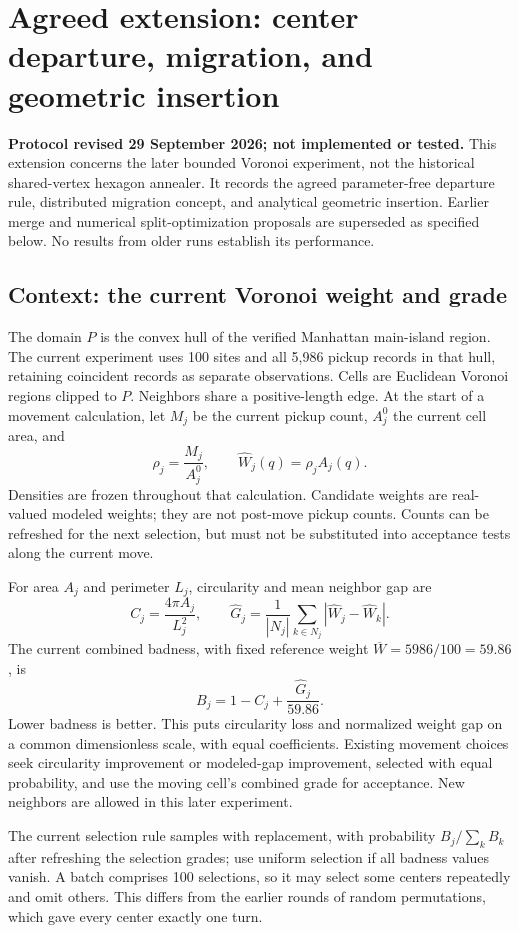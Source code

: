 \documentclass[11pt]{article}
\begin{document}
\clearpage
\section{Agreed extension: center departure, migration, and geometric insertion}
\label{sec:merge-migrate-split}
\textbf{Protocol revised 29 September 2026; not implemented or tested.}
This extension concerns the later bounded Voronoi experiment, not the historical
shared-vertex hexagon annealer. It records the agreed parameter-free departure
rule, distributed migration concept, and analytical geometric insertion.
Earlier merge and numerical split-optimization proposals are superseded as
specified below. No results from older runs establish its performance.

\subsection{Context: the current Voronoi weight and grade}
The domain $P$ is the convex hull of the verified Manhattan main-island region.
The current experiment uses 100 sites and all 5,986 pickup records in that hull,
retaining coincident records as separate observations. Cells are Euclidean
Voronoi regions clipped to $P$. Neighbors share a positive-length edge.
At the start of a movement calculation, let $M_j$ be the current pickup count,
$A_j^0$ the current cell area, and
\[
 \rho_j=\frac{M_j}{A_j^0},\qquad
 \widehat W_j(q)=\rho_j A_j(q).
\]
Densities are frozen throughout that calculation. Candidate weights are real-valued
modeled weights; they are not post-move pickup counts. Counts can be refreshed
for the next selection, but must not be substituted into acceptance tests along
the current move.

For area $A_j$ and perimeter $L_j$, circularity and mean neighbor gap are
\[
 C_j=\frac{4\pi A_j}{L_j^2},\qquad
 \widehat G_j=\frac{1}{|N_j|}\sum_{k\in N_j}
          |\widehat W_j-\widehat W_k|.
\]
The current combined badness, with fixed reference weight
$\overline W=5986/100=59.86$, is
\[
 B_j=1-C_j+\frac{\widehat G_j}{59.86}.
\]
Lower badness is better. This puts circularity loss and normalized weight gap
on a common dimensionless scale, with equal coefficients. Existing movement
choices seek circularity improvement or modeled-gap improvement, selected with
equal probability, and use the moving cell's combined grade for acceptance.
New neighbors are allowed in this later experiment.

The current selection rule samples with replacement, with probability
$B_j/\sum_k B_k$ after refreshing the selection grades; use uniform selection
if all badness values vanish. A batch comprises 100 selections, so it may select
some centers repeatedly and omit others. This differs from the earlier rounds
of random permutations, which gave every center exactly one turn.
\end{document}
